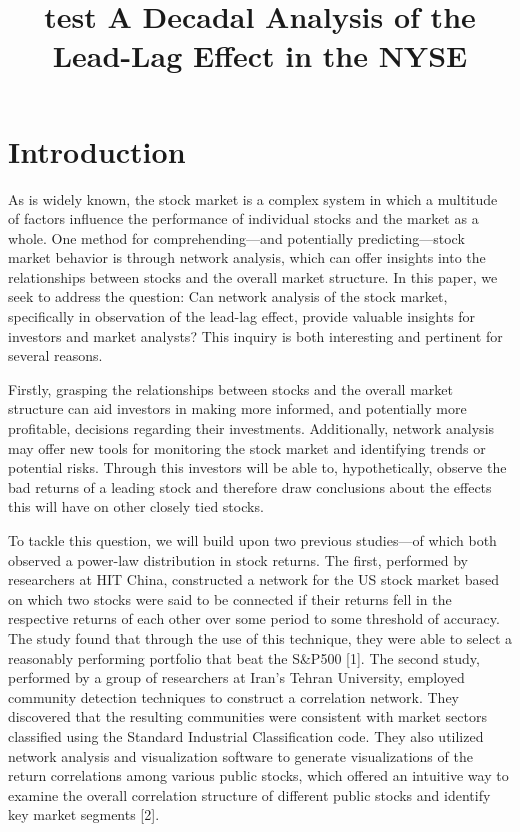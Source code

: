\documentclass{article}
\title{test A Decadal Analysis of the Lead-Lag Effect in the NYSE}
\begin{document}
\maketitle




\section{Introduction}
\large

As is widely known, the stock market is a complex system in which a multitude of factors influence the performance of individual stocks and the market as a whole. One method for comprehending—and potentially predicting—stock market behavior is through network analysis, which can offer insights into the relationships between stocks and the overall market structure. In this paper, we seek to address the question: Can network analysis of the stock market, specifically in observation of the lead-lag effect, provide valuable insights for investors and market analysts? This inquiry is both interesting and pertinent for several reasons.

Firstly, grasping the relationships between stocks and the overall market structure can aid investors in making more informed, and potentially more profitable, decisions regarding their investments. Additionally, network analysis may offer new tools for monitoring the stock market and identifying trends or potential risks. Through this investors will be able to, hypothetically, observe the bad returns of a leading stock and therefore draw conclusions about the effects this will have on other closely tied stocks.

To tackle this question, we will build upon two previous studies—of which both observed a power-law distribution in stock returns. The first, performed by researchers at HIT China, constructed a network for the US stock market based on which two stocks were said to be connected if their returns fell in the respective returns of each other over some period to some threshold of accuracy. The study found that through the use of this technique, they were able to select a reasonably performing portfolio that beat the S\&P500 [1]. The second study, performed by a group of researchers at Iran's Tehran University, employed community detection techniques to construct a correlation network. They discovered that the resulting communities were consistent with market sectors classified using the Standard Industrial Classification code. They also utilized network analysis and visualization software to generate visualizations of the return correlations among various public stocks, which offered an intuitive way to examine the overall correlation structure of different public stocks and identify key market segments [2].
\end{document}
